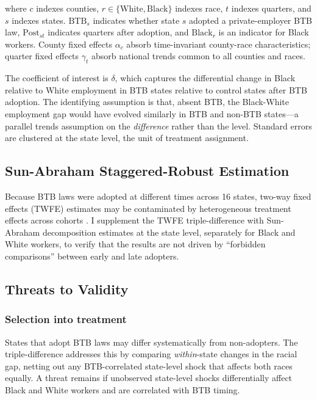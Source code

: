 \documentclass[12pt]{article}
\begin{document}
\noindent where $c$ indexes counties, $r \in \{\text{White}, \text{Black}\}$ indexes race, $t$ indexes quarters, and $s$ indexes states. $\text{BTB}_s$ indicates whether state $s$ adopted a private-employer BTB law, $\text{Post}_{st}$ indicates quarters after adoption, and $\text{Black}_r$ is an indicator for Black workers. County fixed effects $\alpha_c$ absorb time-invariant county-race characteristics; quarter fixed effects $\gamma_t$ absorb national trends common to all counties and races.

The coefficient of interest is $\delta$, which captures the differential change in Black relative to White employment in BTB states relative to control states after BTB adoption. The identifying assumption is that, absent BTB, the Black-White employment gap would have evolved similarly in BTB and non-BTB states---a parallel trends assumption on the \textit{difference} rather than the level. Standard errors are clustered at the state level, the unit of treatment assignment.

\subsection{Sun-Abraham Staggered-Robust Estimation}

Because BTB laws were adopted at different times across 16 states, two-way fixed effects (TWFE) estimates may be contaminated by heterogeneous treatment effects across cohorts \citep{goodman2021, sun2021}. I supplement the TWFE triple-difference with Sun-Abraham decomposition estimates at the state level, separately for Black and White workers, to verify that the results are not driven by ``forbidden comparisons'' between early and late adopters.

\subsection{Threats to Validity}

\subsubsection*{Selection into treatment} States that adopt BTB laws may differ systematically from non-adopters. The triple-difference addresses this by comparing \textit{within}-state changes in the racial gap, netting out any BTB-correlated state-level shock that affects both races equally. A threat remains if unobserved state-level shocks differentially affect Black and White workers and are correlated with BTB timing.
\end{document}
